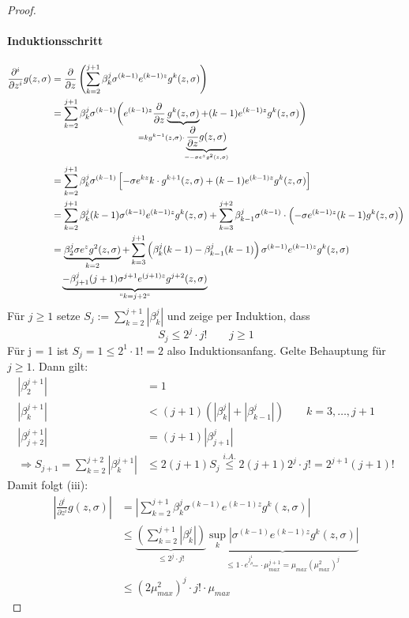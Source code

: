 \begin{lemma}
\begin{proof}
		\paragraph*{Induktionsschritt}
		\begin{align*}
			\frac{\partial^i}{\partial z^i} g(z,\sigma) &= \frac{\partial}{\partial z} \left( \sum_{k=2}^{j+1} \beta_k^j \sigma^{(k-1)} e^{(k-1)z} g^k(z,\sigma) \right)\\
			&= \sum_{k=2}^{j+1} \beta_k^j \sigma^{(k-1)} \bigg( e^{(k-1)z} \frac{\partial}{\partial z} \underbrace{g^k(z,\sigma)}_{\mathclap{= kg^{k-1}(z,\sigma) \cdot \underbrace{\frac{\partial}{\partial z} g(z,\sigma)}_{=-\sigma e^z g^2(z,\sigma)}}}+(k-1)e^{(k-1)z} g^k(z,\sigma) \bigg)\\
			&= \sum_{k=2}^{j+1} \beta_k^j \sigma^{(k-1)} \left[ -\sigma e^{kz} k \cdot g^{k+1}(z,\sigma) + (k-1) e^{(k-1)z} g^k(z,\sigma) \right]\\
			&= \sum_{k=2}^{j+1} \beta_k^j (k-1) \sigma^{(k-1)} e^{(k-1)z} g^k(z,\sigma) + \sum_{k=3}^{j+2} \beta_{k-1}^j \sigma^{(k-1)} \cdot \left( -\sigma e^{(k-1)z} (k-1) g^k(z,\sigma) \right)\\
			&= \underbrace{\beta_2^j \sigma e^z g^2(z,\sigma)}_{k = 2} + \sum_{k=3}^{j+1} \left( \beta_k^j(k-1) - \beta_{k-1}^j(k-1) \right) \sigma^{(k-1)} e^{(k-1)z} g^k(z,\sigma)\\
			&\quad \underbrace{- \beta_{j+1}^j (j+1) \sigma^{j+1} e^{(j+1)z} g^{j+2}(z,\sigma)}_{``k=j+2``}
		\end{align*}
	Für $j \geq 1$ setze $S_j := \sum\limits_{k=2}^{j+1} |\beta_k^j|$ und zeige per Induktion, dass
	\[
		S_j \leq 2^j \cdot j! \qquad j \geq 1
	\]
	Für j = 1 ist $S_j =1 \leq 2^1 \cdot 1! = 2$ also Induktionsanfang.
	Gelte Behauptung für $j \geq 1$. Dann gilt:
	\begin{align*}
		|\beta_2^{j+1}| &= 1 \\
		|\beta_k^{j+1}| &< (j+1)(|\beta_k^j| + |\beta_{k-1}^j|) \qquad k=3,\dots,j+1 \\
		|\beta_{j+2}^{j+1}| &= (j+1) |\beta_{j+1}^j| \\
		\Rightarrow S_{j+1} = \sum\limits_{k=2}^{j+2} |\beta_k^{j+1}| &\leq 2 (j+1) S_j \overset{i.A.}{\leq} 2 (j+1) 2^j \cdot j! = 2^{j+1} (j+1)!
	\end{align*}
	Damit folgt (iii):
	\begin{align*}
	|\frac{\partial^i}{\partial z^i} g(z,\sigma)| &= |\sum\limits_{k=2}^{j+1} \beta_k^j \sigma^{(k-1)} e^{(k-1)z} g^k(z,\sigma)| \\
	&\leq \underbrace{(\sum\limits_{k=2}^{j+1} |\beta_k^j|)}_{\leq 2^j \cdot j!} \underbrace{\sup_k |\sigma^{(k-1)} e^{(k-1)z} g^k(z,\sigma)|}_{\leq 1 \cdot e^{j_{\mu_{max}}^1} \cdot \mu_{max}^{j+1} = \mu_{max} (\mu_{max}^2)^j} \\
	&\leq (2 \mu_{max}^2)^j \cdot j! \cdot \mu_{max}
	\end{align*}
	\end{proof}
\end{lemma}

